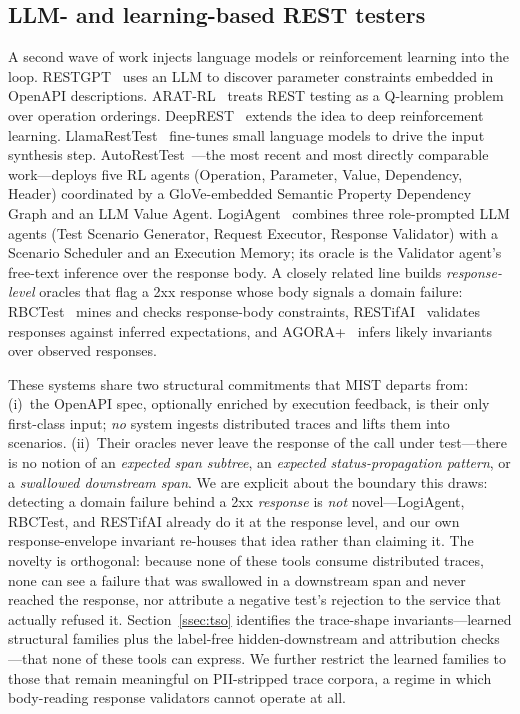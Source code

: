 \documentclass[conference]{IEEEtran}
\begin{document}
\subsection{LLM- and learning-based REST testers}
A second wave of work injects language models or reinforcement learning
into the loop.  RESTGPT~\cite{kim2024restgpt} uses an LLM to discover
parameter constraints embedded in OpenAPI descriptions.  ARAT-RL~\cite{kim2023adaptive}
treats REST testing as a Q-learning problem over operation orderings.
DeepREST~\cite{corradini2024deeprest} extends the idea to deep
reinforcement learning.  LlamaRestTest~\cite{llamaresttest2025}
fine-tunes small language models to drive the input synthesis step.
AutoRestTest~\cite{stennett2025autoresttest,kim2024multiagent}---the most
recent and most directly comparable work---deploys five RL agents
(Operation, Parameter, Value, Dependency, Header) coordinated by a
GloVe-embedded Semantic Property Dependency Graph and an LLM Value
Agent.  LogiAgent~\cite{zhang2025logiagent} combines three role-prompted
LLM agents (Test Scenario Generator, Request Executor, Response
Validator) with a Scenario Scheduler and an Execution Memory; its oracle
is the Validator agent's free-text inference over the response body.
A closely related line builds \emph{response-level} oracles that flag a
2xx response whose body signals a domain failure: RBCTest~\cite{rbctest2026}
mines and checks response-body constraints, RESTifAI~\cite{restifai2026}
validates responses against inferred expectations, and
AGORA+~\cite{agoraplus2025} infers likely invariants over observed
responses.

These systems share two structural commitments that \textsc{MIST}
departs from: (i)~the OpenAPI spec, optionally enriched by execution
feedback, is their only first-class input; \emph{no} system ingests
distributed traces and lifts them into scenarios.  (ii)~Their oracles
never leave the response of the call under test---there is no notion of
an \emph{expected span subtree}, an \emph{expected status-propagation
pattern}, or a \emph{swallowed downstream span}.  We are explicit about
the boundary this draws: detecting a domain failure behind a 2xx
\emph{response} is \emph{not} novel---LogiAgent, RBCTest, and RESTifAI
already do it at the response level, and our own response-envelope
invariant re-houses that idea rather than claiming it.  The novelty is
orthogonal: because none of these tools consume distributed traces, none
can see a failure that was swallowed in a downstream span and never
reached the response, nor attribute a negative test's rejection to the
service that actually refused it.  Section~\ref{ssec:tso} identifies the
trace-shape invariants---learned structural families plus the label-free
hidden-downstream and attribution checks---that none of these tools can
express.  We further restrict the learned families to those that remain
meaningful on PII-stripped trace corpora, a regime in which body-reading
response validators cannot operate at all.
\end{document}

